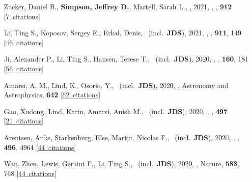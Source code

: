 \item[{\color{numcolor}\scriptsize53}] Zucker, Daniel B., \textbf{Simpson, Jeffrey D.}, Martell, Sarah L., \etal, 2021, , \apj, \textbf{912} [\href{https://ui.adsabs.harvard.edu/#abs/2021ApJ...912L..30Z}{7~citations}]

\item[{\color{numcolor}\scriptsize52}] Li, Ting S., Koposov, Sergey E., Erkal, Denis, \etal\ (incl.\ \textbf{JDS}), 2021, , \apj, \textbf{911}, 149 [\href{https://ui.adsabs.harvard.edu/#abs/2021ApJ...911..149L}{46~citations}]

\item[{\color{numcolor}\scriptsize51}] Ji, Alexander P., Li, Ting S., Hansen, Terese T., \etal\ (incl.\ \textbf{JDS}), 2020, , \aj, \textbf{160}, 181 [\href{https://ui.adsabs.harvard.edu/#abs/2020AJ....160..181J}{56~citations}]

\item[{\color{numcolor}\scriptsize50}] Amarsi, A. M., Lind, K., Osorio, Y., \etal\ (incl.\ \textbf{JDS}), 2020, , Astronomy and Astrophysics, \textbf{642} [\href{https://ui.adsabs.harvard.edu/#abs/2020A&A...642A..62A}{62~citations}]

\item[{\color{numcolor}\scriptsize49}] Gao, Xudong, Lind, Karin, Amarsi, Anish M., \etal\ (incl.\ \textbf{JDS}), 2020, , \mnras, \textbf{497} [\href{https://ui.adsabs.harvard.edu/#abs/2020MNRAS.497L..30G}{21~citations}]

\item[{\color{numcolor}\scriptsize48}] Arentsen, Anke, Starkenburg, Else, Martin, Nicolas F., \etal\ (incl.\ \textbf{JDS}), 2020, , \mnras, \textbf{496}, 4964 [\href{https://ui.adsabs.harvard.edu/#abs/2020MNRAS.496.4964A}{44~citations}]

\item[{\color{numcolor}\scriptsize47}] Wan, Zhen, Lewis, Geraint F., Li, Ting S., \etal\ (incl.\ \textbf{JDS}), 2020, , Nature, \textbf{583}, 768 [\href{https://ui.adsabs.harvard.edu/#abs/2020Natur.583..768W}{44~citations}]

